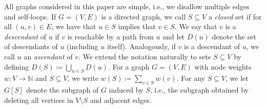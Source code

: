 \documentclass[10pt,a4paper]{article}
\newcommand{\nats}{\mathbb N}
\begin{document}
All graphs considered in this paper are simple, i.e., we disallow multiple edges and self-loops. If $G=(V,E)$ is a directed graph, we call $S\subseteq V$ a \emph{closed} set if for all $(u,v)\in E$, we have that $u\in S$ implies that $v\in S$. We say that $v$ is a \emph{descendant} of $u$ if $v$ is reachable by a path from $u$ and let $D(u)$ denote the set of descendants of $u$ (including $u$ itself). Analogously, if $v$ is a descendant of $u$, we call $u$ an \emph{ascendant} of $v$. We extend the notation naturally to sets $S\subseteq V$ by defining $D(S) \coloneqq \bigcup_{u\in S} D(u)$.
For a graph $G=(V,E)$ with node weights $w: V\to \nats$ and $S\subseteq V$, we write $w(S) \coloneqq \sum_{v\in S}w(v)$. For any $S\subseteq V$, we let $G[S]$ denote the subgraph of $G$ induced by $S$, i.e., the subgraph obtained by deleting all vertices in $V\setminus S$ and adjacent edges.
%

\setcounter{section}{2}
\end{document}
